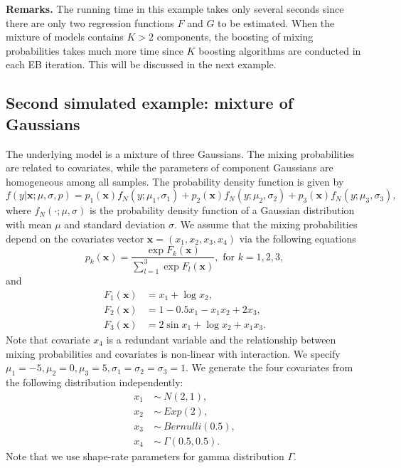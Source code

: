 \documentclass[11pt]{article}
\numberwithin{equation}{section}
\def\bx{\boldsymbol{x}}
\begin{document}
{\bf Remarks.} The running time in this example takes only several seconds since there are only two regression functions $F$ and $G$ to be estimated.
When the mixture of models contains $K>2$ components, the boosting of mixing probabilities takes much more time since $K$ boosting algorithms are conducted in each EB iteration. This will be discussed in the next example.

\subsection{Second simulated example: mixture of Gaussians}

The underlying model is a mixture of three Gaussians. The mixing probabilities are related to covariates, while the parameters of component Gaussians are homogeneous among all samples.
The probability density function is given by
\begin{equation}
f(y|\bx; \mu,\sigma,p)=p_1(\bx)f_N(y;\mu_1,\sigma_1)+p_2(\bx)f_N(y;\mu_2,\sigma_2)+p_3(\bx)f_N(y;\mu_3,\sigma_3),
\end{equation}
where $f_N(\cdot;\mu,\sigma)$ is the probability density function of a Gaussian distribution with mean $\mu$ and standard deviation $\sigma$.
We assume that the mixing probabilities depend on the covariates vector $\bx=(x_1,x_2,x_3,x_4)$ via the following equations
\begin{equation}\label{logistic-ex}
	p_k(\bx)=\frac{\exp{F_k(\bx)}}{\sum_{l=1}^{3}\exp{F_l(\bx)}}, \text{ for } k=1,2,3,
\end{equation}
and 
\begin{align*}
F_1(\bx)&=x_1+\log x_2,\\
 F_2(\bx)&=1-0.5x_1-x_1x_2+2x_3, \\
  F_3(\bx)&=2\sin x_1+\log x_2 + x_1x_3.
	\end{align*}
Note that covariate $x_4$ is a redundant variable and the relationship between mixing probabilities and covariates is non-linear with interaction. 
We specify $\mu_1=-5,\mu_2=0,\mu_3=5, \sigma_1=\sigma_2=\sigma_3=1$. We generate the four covariates from the following distribution independently:
   \begin{align*}
   	x_1~&\sim~ N(2,1),\\
   	x_2~&\sim~ Exp(2), \\
   	x_3~&\sim~ Bernulli(0.5), \\
   	x_4~&\sim~ \Gamma(0.5,0.5).
   \end{align*}
Note that we use shape-rate parameters for gamma distribution $\Gamma$.
\end{document}
